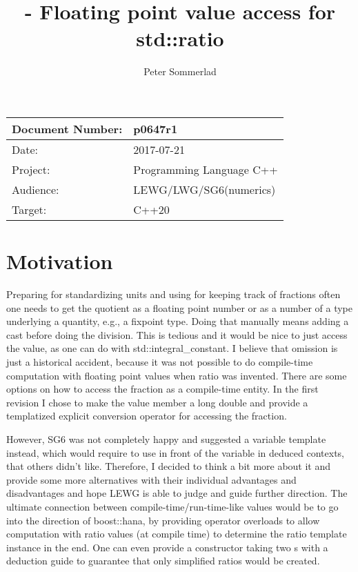 \documentclass[ebook,11pt,article]{memoir}
\title{\papernumber{} - Floating point value access for std::ratio}
\author{Peter Sommerlad}
\date{\paperdate}                        %
\newcommand{\papernumber}{p0647r1}
\newcommand{\paperdate}{2017-07-21}
\begin{document}
\maketitle
\begin{center}
\begin{tabular}[t]{|l|l|}\hline 
Document Number:& \papernumber  \\\hline
Date: & \paperdate \\\hline
Project: & Programming Language C++\\\hline 
Audience: & LEWG/LWG/SG6(numerics)\\\hline
Target: & C++20\\\hline
\end{tabular}
\end{center}

\chapter{Motivation}

Preparing for standardizing units and using  for keeping track of fractions often one needs to get the quotient as a floating point number or as a number of a type underlying a quantity, e.g., a fixpoint type. Doing that manually means adding a cast before doing the division. This is tedious and it would be nice to just access the value, as one can do with std::integral_constant. I believe that omission is just a historical accident, because it was not possible to do compile-time computation with floating point values when ratio was invented. There are some options on how to access the fraction as a compile-time entity. In the first revision I chose to make the value member a long double and provide a templatized explicit conversion operator for accessing the fraction.

However, SG6 was not completely happy and suggested a variable template instead, which would require to use  in front of the variable in deduced contexts, that others didn't like. Therefore, I decided to think a bit more about it and provide some more alternatives with their individual advantages and disadvantages and hope LEWG is able to judge and guide further direction. The ultimate connection between compile-time/run-time-like values would be to go into the direction of boost::hana, by providing operator overloads to allow computation with ratio values (at compile time) to determine the ratio template instance in the end. One can even provide a constructor taking two s with a deduction guide to guarantee that only simplified ratios would be created.
\end{document}
